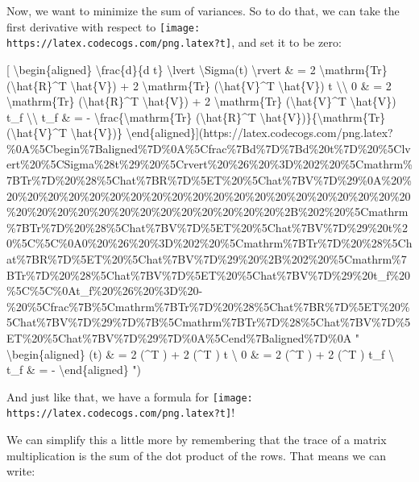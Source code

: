 \documentclass[]{article}
\begin{document}
Now, we want to minimize the sum of variances. So to do that, we can take the
first derivative with respect to
\texttt{[image: https://latex.codecogs.com/png.latex?t]}, and set it to be zero:

{[} \textbackslash{}begin\{aligned\} \textbackslash{}frac\{d\}\{d t\}
\textbackslash{}lvert \textbackslash{}Sigma(t) \textbackslash{}rvert \& = 2
\textbackslash{}mathrm\{Tr\} (\textbackslash{}hat\{R\}\^{}T
\textbackslash{}hat\{V\}) + 2 \textbackslash{}mathrm\{Tr\}
(\textbackslash{}hat\{V\}\^{}T \textbackslash{}hat\{V\}) t
\textbackslash{}\textbackslash{} 0 \& = 2 \textbackslash{}mathrm\{Tr\}
(\textbackslash{}hat\{R\}\^{}T \textbackslash{}hat\{V\}) + 2
\textbackslash{}mathrm\{Tr\} (\textbackslash{}hat\{V\}\^{}T
\textbackslash{}hat\{V\}) t\_f \textbackslash{}\textbackslash{} t\_f \& = -
\textbackslash{}frac\{\textbackslash{}mathrm\{Tr\}
(\textbackslash{}hat\{R\}\^{}T
\textbackslash{}hat\{V\})\}\{\textbackslash{}mathrm\{Tr\}(\textbackslash{}hat\{V\}\^{}T
\textbackslash{}hat\{V\})\}
\textbackslash{}end\{aligned\}{]}(https://latex.codecogs.com/png.latex?\%0A\%5Cbegin\%7Baligned\%7D\%0A\%5Cfrac\%7Bd\%7D\%7Bd\%20t\%7D\%20\%5Clvert\%20\%5CSigma\%28t\%29\%20\%5Crvert\%20\%26\%20\%3D\%202\%20\%5Cmathrm\%7BTr\%7D\%20\%28\%5Chat\%7BR\%7D\%5ET\%20\%5Chat\%7BV\%7D\%29\%0A\%20\%20\%20\%20\%20\%20\%20\%20\%20\%20\%20\%20\%20\%20\%20\%20\%20\%20\%20\%20\%20\%20\%20\%20\%20\%20\%20\%20\%20\%20\%20\%20\%20\%20\%2B\%202\%20\%5Cmathrm\%7BTr\%7D\%20\%28\%5Chat\%7BV\%7D\%5ET\%20\%5Chat\%7BV\%7D\%29\%20t\%20\%5C\%5C\%0A0\%20\%26\%20\%3D\%202\%20\%5Cmathrm\%7BTr\%7D\%20\%28\%5Chat\%7BR\%7D\%5ET\%20\%5Chat\%7BV\%7D\%29\%20\%2B\%202\%20\%5Cmathrm\%7BTr\%7D\%20\%28\%5Chat\%7BV\%7D\%5ET\%20\%5Chat\%7BV\%7D\%29\%20t\_f\%20\%5C\%5C\%0At\_f\%20\%26\%20\%3D\%20-\%20\%5Cfrac\%7B\%5Cmathrm\%7BTr\%7D\%20\%28\%5Chat\%7BR\%7D\%5ET\%20\%5Chat\%7BV\%7D\%29\%7D\%7B\%5Cmathrm\%7BTr\%7D\%28\%5Chat\%7BV\%7D\%5ET\%20\%5Chat\%7BV\%7D\%29\%7D\%0A\%5Cend\%7Baligned\%7D\%0A
" \textbackslash{}begin\{aligned\}  \lvert \Sigma(t) \rvert \& = 2
 (\^{}T ) + 2  (\^{}T ) t
\textbackslash{} 0 \& = 2  (\^{}T ) + 2 
(\^{}T ) t\_f \textbackslash{} t\_f \& = -
\textbackslash{}end\{aligned\} ")

And just like that, we have a formula for
\texttt{[image: https://latex.codecogs.com/png.latex?t]}!

We can simplify this a little more by remembering that the trace of a matrix
multiplication is the sum of the dot product of the rows. That means we can
write:
\end{document}

